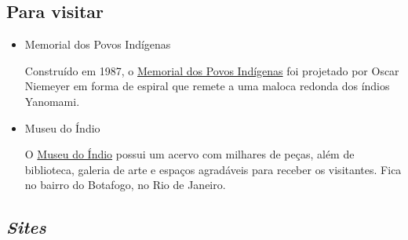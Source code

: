 \documentclass[12pt]{extarticle}
\begin{document}
\subsection{Para visitar}

\begin{itemize}

\item Memorial dos Povos Indígenas

Construído em 1987, o \href{http://www.cultura.df.gov.br/memorial-dos-povos-indigenas/}{Memorial dos Povos Indígenas} foi projetado por Oscar Niemeyer em forma de espiral que remete a uma maloca redonda dos índios Yanomami. 

\item Museu do Índio

O \href{http://www.museudoindio.gov.br}{Museu do Índio} possui um acervo com 
milhares de peças, além de biblioteca, galeria de arte e espaços agradáveis para 
receber os visitantes. Fica no bairro do Botafogo, no Rio de Janeiro.

\end{itemize}

\subsection{\emph{Sites}}
\end{document}
